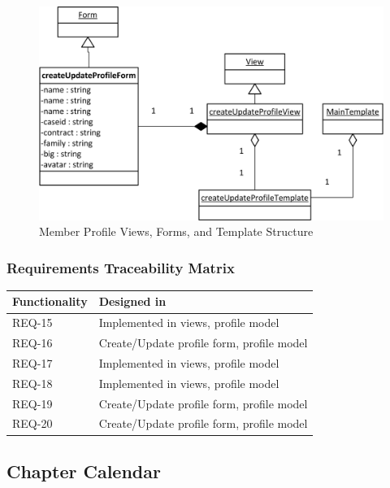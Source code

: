 \documentclass{article}
\begin{document}
\FloatBarrier
\begin{figure}[h!]
\centering
\includegraphics[scale=.65]{img/viewFormTemplateDiagrams/createUpdateProfile}
\caption{Member Profile Views, Forms, and Template Structure}
\label{fig:memberProfileViewFormTemplateDiagram}
\end{figure}
\FloatBarrier

\subsubsection{Requirements Traceability Matrix}

\begin{table}
    \begin{tabular}{|l|l|}
        \hline
        Functionality & Designed in                               \\ \hline
        REQ-15        & Implemented in views, profile model       \\ 
        REQ-16        & Create/Update profile form, profile model \\ 
        REQ-17        & Implemented in views, profile model       \\ 
        REQ-18        & Implemented in views, profile model       \\ 
        REQ-19        & Create/Update profile form, profile model \\ 
        REQ-20        & Create/Update profile form, profile model \\
        \hline
    \end{tabular}
\end{table}


\subsection{Chapter Calendar}
\end{document}
